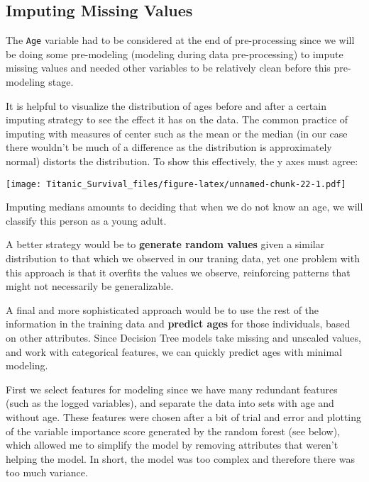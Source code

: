 \documentclass[]{article}
\begin{document}
\subsection{Imputing Missing Values}\label{imputing-missing-values}

The \texttt{Age} variable had to be considered at the end of
pre-processing since we will be doing some pre-modeling (modeling during
data pre-processing) to impute missing values and needed other variables
to be relatively clean before this pre-modeling stage.

It is helpful to visualize the distribution of ages before and after a
certain imputing strategy to see the effect it has on the data. The
common practice of imputing with measures of center such as the mean or
the median (in our case there wouldn't be much of a difference as the
distribution is approximately normal) distorts the distribution. To show
this effectively, the y axes must agree:

\texttt{[image: Titanic\_Survival\_files/figure-latex/unnamed-chunk-22-1.pdf]}

Imputing medians amounts to deciding that when we do not know an age, we
will classify this person as a young adult.

A better strategy would be to \textbf{generate random values} given a
similar distribution to that which we observed in our traning data, yet
one problem with this approach is that it overfits the values we
observe, reinforcing patterns that might not necessarily be
generalizable.

A final and more sophisticated approach would be to use the rest of the
information in the training data and \textbf{predict ages} for those
individuals, based on other attributes. Since Decision Tree models take
missing and unscaled values, and work with categorical features, we can
quickly predict ages with minimal modeling.

First we select features for modeling since we have many redundant
features (such as the logged variables), and separate the data into sets
with age and without age. These features were chosen after a bit of
trial and error and plotting of the variable importance score generated
by the random forest (see below), which allowed me to simplify the model
by removing attributes that weren't helping the model. In short, the
model was too complex and therefore there was too much variance.
\end{document}
